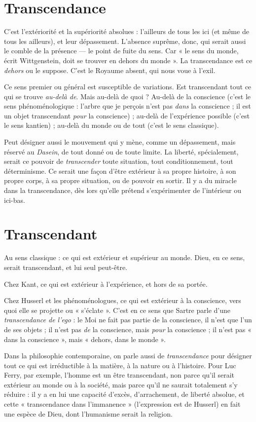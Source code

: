 \section{Transcendance}
C'est l’extériorité et la supériorité absolues : l’ailleurs
de tous les ici (et même de tous les ailleurs), et leur
dépassement. L'absence suprême, donc, qui serait aussi le comble de la présence
— le point de fuite du sens. Car « le sens du monde, écrit Wittgenstein,
doit se trouver en dehors du monde ». La transcendance est ce {\it dehors} ou le suppose.
C’est le Royaume absent, qui nous voue à l’exil.

Ce sens premier ou général est susceptible de variations. Est transcendant
tout ce qui se trouve {\it au-delà de}. Mais au-delà de quoi ? Au-delà de la conscience
(c’est le sens phénoménologique : l'arbre que je perçois n’est pas {\it dans} la
conscience ; il est un objet transcendant {\it pour} la conscience) ; au-delà de l’expérience
possible (c’est le sens kantien) ; au-delà du monde ou de tout (c’est le
sens classique).

Peut désigner aussi le mouvement qui y mène, comme un dépassement,
mais réservé au {\it Dasein}, de tout donné ou de toute limite. La liberté, spécialement,
serait ce pouvoir de {\it transcender} toute situation, tout conditionnement,
tout déterminisme. Ce serait une façon d’être extérieur à sa propre histoire, à
son propre corps, à sa propre situation, ou de pouvoir en sortir. Il y a du
miracle dans la transcendance, dès lors qu’elle prétend s’expérimenter de l’intérieur
ou ici-bas.

\section{Transcendant}
Au sens classique : ce qui est extérieur et supérieur au
monde. Dieu, en ce sens, serait transcendant, et lui seul
peut-être.

Chez Kant, ce qui est extérieur à l'expérience, et hors de sa portée.

Chez Husserl et les phénoménologues, ce qui est extérieur à la conscience,
vers quoi elle se projette ou « s'éclate ». C’est en ce sens que Sartre parle d’une
{\it transcendance de l'ego} : le Moi ne fait pas partie de la conscience, il n’est que
l’un de ses objets ; il n’est pas {\it de} la conscience, mais {\it pour} la conscience ; il n’est
pas « dans la conscience », mais « dehors, dans le monde ».

Dans la philosophie contemporaine, on parle aussi de {\it transcendance} pour
désigner tout ce qui est irréductible à la matière, à la nature ou à l’histoire. Pour
Luc Ferry, par exemple, l'homme est un être transcendant, non parce qu’il
serait extérieur au monde ou à la société, mais parce qu’il ne saurait totalement
s’y réduire : il y a en lui une capacité d’excès, d’arrachement, de liberté absolue,
et cette « transcendance dans l’immanence » (l'expression est de Husserl) en fait
une espèce de Dieu, dont l’humanisme serait la religion.


